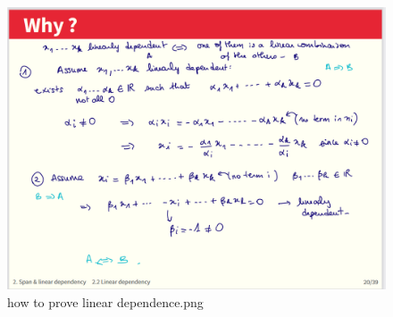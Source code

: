 \documentclass[12pt,twoside]{article}
\begin{document}
\begin{figure}[h]
    \centering
    \includegraphics[scale=.45]{screenshots/how to prove linear dependence.png}
    \caption{how to prove linear dependence.png}
    \label{fig:my_label}
\end{figure}
\end{document}
